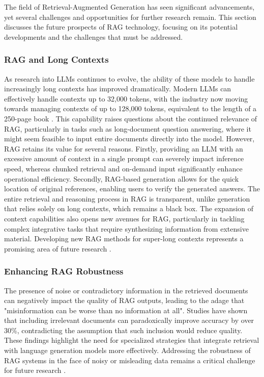The field of Retrieval-Augmented Generation has seen significant advancements, yet several challenges and opportunities for further research remain. This section discusses the future prospects of RAG technology, focusing on its potential developments and the challenges that must be addressed.

\subsubsection{RAG and Long Contexts}

As research into LLMs continues to evolve, the ability of these models to handle increasingly long contexts has improved dramatically. Modern LLMs can effectively handle contexts up to 32,000 tokens, with the industry now moving towards managing contexts of up to 128,000 tokens, equivalent to the length of a 250-page book \cite{ibm2023}. This capability raises questions about the continued relevance of RAG, particularly in tasks such as long-document question answering, where it might seem feasible to input entire documents directly into the model. However, RAG retains its value for several reasons. Firstly, providing an LLM with an excessive amount of context in a single prompt can severely impact inference speed, whereas chunked retrieval and on-demand input significantly enhance operational efficiency. Secondly, RAG-based generation allows for the quick location of original references, enabling users to verify the generated answers. The entire retrieval and reasoning process in RAG is transparent, unlike generation that relies solely on long contexts, which remains a black box. The expansion of context capabilities also opens new avenues for RAG, particularly in tackling complex integrative tasks that require synthesizing information from extensive material. Developing new RAG methods for super-long contexts represents a promising area of future research \cite{gao2023retrieval}.

\subsubsection{Enhancing RAG Robustness}

The presence of noise or contradictory information in the retrieved documents can negatively impact the quality of RAG outputs, leading to the adage that "misinformation can be worse than no information at all". Studies have shown that including irrelevant documents can paradoxically improve accuracy by over 30\%, contradicting the assumption that such inclusion would reduce quality. These findings highlight the need for specialized strategies that integrate retrieval with language generation models more effectively. Addressing the robustness of RAG systems in the face of noisy or misleading data remains a critical challenge for future research \cite{cuconasu2024power}.

